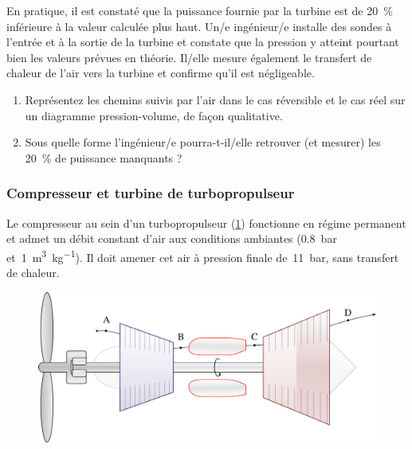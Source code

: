 	En pratique, il est constaté que la puissance fournie par la turbine est de \SI{20}{\percent} inférieure à la valeur calculée plus haut. Un/e ingénieur/e installe des sondes à l’entrée et à la sortie de la turbine et constate que la pression y atteint pourtant bien les valeurs prévues en théorie. Il/elle mesure également le transfert de chaleur de l’air vers la turbine et confirme qu’il est négligeable.
	
	\begin{enumerate}
		\item Représentez les chemins suivis par l’air dans le cas réversible et le cas réel sur un diagramme pression-volume, de façon qualitative.
		\item Sous quelle forme l’ingénieur/e pourra-t-il/elle retrouver (et mesurer) les \SI{20}{\percent} de puissance manquants ?
	\end{enumerate}


	
\subsubsection{Compresseur et turbine de turbopropulseur}
\label{exo_compresseur_turbine_turbopropulseur}

	\wherefrom{[DS n°2 2012, 11 pts]}

	Le compresseur au sein d’un turbopropulseur (\cref{fig_turboprop}) fonctionne en régime permanent et admet un débit constant d’air aux conditions ambiantes (\SI{0,8}{\bar} et~\SI{1}{\metre\cubed\per\kilogram}). Il doit amener cet air à pression finale de~\SI{11}{\bar}, sans transfert de chaleur.
	
	\begin{figure}
		\begin{center}
			\includegraphics[width=12cm]{images/circuit_turboprop.png}
		\end{center}
		\label{fig_turboprop}
	\end{figure}

